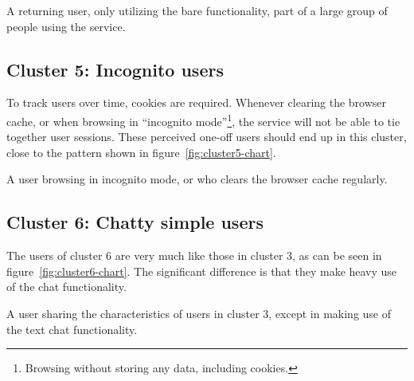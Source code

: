 \begin{persona}
  A returning user, only utilizing the bare functionality, part of a large group of people using the service.
\end{persona}

\subsection{Cluster 5: Incognito users}

To track users over time, cookies are required. Whenever clearing the browser cache, or when browsing in ``incognito mode''\footnote{Browsing without storing any data, including cookies.}, the service will not be able to tie together user sessions. These perceived one-off users should end up in this cluster, close to the pattern shown in figure~\ref{fig:cluster5-chart}.

\begin{persona}
  A user browsing in incognito mode, or who clears the browser cache regularly.
\end{persona}

\subsection{Cluster 6: Chatty simple users}

The users of cluster 6 are very much like those in cluster 3, as can be seen in figure~\ref{fig:cluster6-chart}. The significant difference is that they make heavy use of the chat functionality.

\begin{persona}
  A user sharing the characteristics of users in cluster 3, except in making use of the text chat functionality.
\end{persona}
